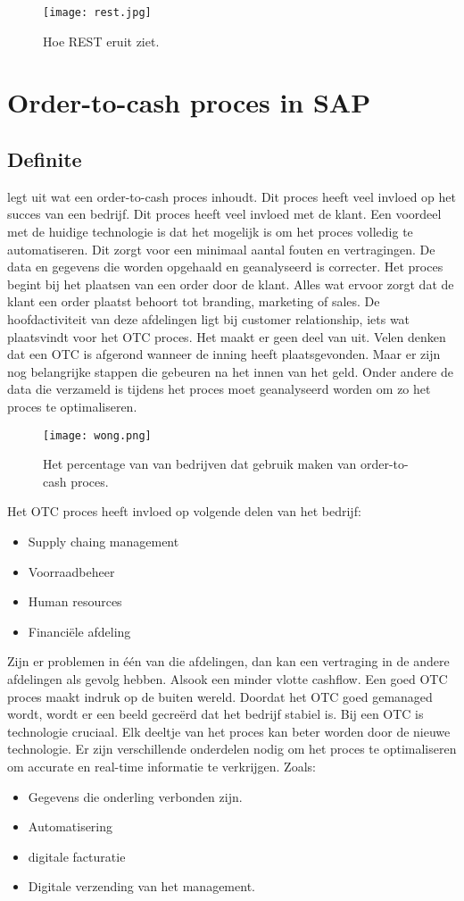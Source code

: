 \begin{figure}[h!]
	\texttt{[image: rest.jpg]}
	\centering
	\caption{Hoe REST eruit ziet. \textcite{stSoftware2019tS}}
\end{figure}
\section{Order-to-cash proces in SAP}
\subsection{Definite}
\textcite{Wong2018} legt uit wat een order-to-cash proces inhoudt. Dit proces heeft veel invloed op het succes van een bedrijf. Dit proces heeft veel invloed met de klant. Een voordeel met de huidige technologie is dat het mogelijk is om het proces volledig te automatiseren. Dit zorgt voor een minimaal aantal fouten en vertragingen. De data en gegevens die worden opgehaald en geanalyseerd is correcter. 
Het proces begint bij het plaatsen van een order door de klant. Alles wat ervoor zorgt dat de klant een order plaatst behoort tot branding, marketing of sales. De hoofdactiviteit van deze afdelingen ligt bij customer relationship, iets wat plaatsvindt voor het OTC proces. Het maakt er geen deel van uit. 
Velen denken dat een OTC is afgerond wanneer de inning heeft plaatsgevonden. Maar er zijn nog belangrijke stappen die gebeuren na het innen van het geld. Onder andere de data die verzameld is tijdens het proces moet geanalyseerd worden om zo het proces te optimaliseren. 
\begin{figure}[h]
	\texttt{[image: wong.png]}
	\caption{Het percentage van van bedrijven dat gebruik maken van order-to-cash proces. \textcite{Wong2018}}
	\centering
\end{figure}
Het OTC proces heeft invloed op volgende delen van het bedrijf:
\begin{itemize}
	\item Supply chaing management
	\item Voorraadbeheer
	\item Human resources
	\item Financiële afdeling
\end{itemize}
Zijn er problemen in één van die afdelingen, dan kan een vertraging in de andere afdelingen als gevolg hebben. Alsook een minder vlotte cashflow. 
Een goed OTC proces maakt indruk op de buiten wereld. Doordat het OTC goed gemanaged wordt, wordt er een beeld gecreërd dat het bedrijf stabiel is. 
Bij een OTC is technologie cruciaal. Elk deeltje van het proces kan beter worden door de nieuwe  technologie. Er zijn verschillende onderdelen nodig om het proces te optimaliseren om accurate en real-time informatie te verkrijgen. Zoals: 
\begin{itemize}
	\item Gegevens die onderling verbonden zijn.
	\item Automatisering
	\item digitale facturatie
	\item Digitale verzending van het management.
\end{itemize}

